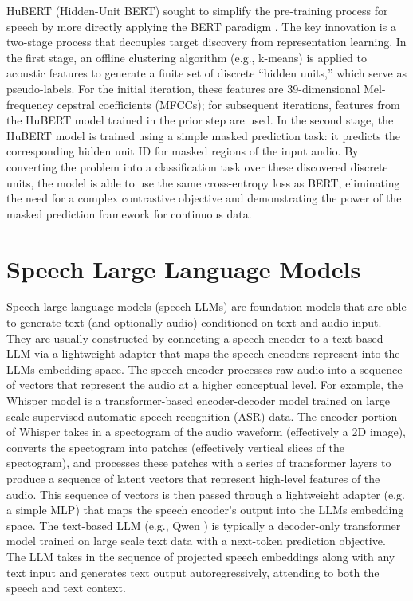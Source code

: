 \documentclass{report}
\begin{document}
HuBERT (Hidden-Unit BERT) sought to simplify the pre-training process for speech by more directly applying the BERT paradigm \citep{hsu2021hubertselfsupervisedspeechrepresentation}. The key innovation is a two-stage process that decouples target discovery from representation learning. In the first stage, an offline clustering algorithm (e.g., k-means) is applied to acoustic features to generate a finite set of discrete ``hidden units,'' which serve as pseudo-labels. For the initial iteration, these features are 39-dimensional Mel-frequency cepstral coefficients (MFCCs); for subsequent iterations, features from the HuBERT model trained in the prior step are used. In the second stage, the HuBERT model is trained using a simple masked prediction task: it predicts the corresponding hidden unit ID for masked regions of the input audio. By converting the problem into a classification task over these discovered discrete units, the model is able to use the same cross-entropy loss as BERT, eliminating the need for a complex contrastive objective and demonstrating the power of the masked prediction framework for continuous data.

\section{Speech Large Language Models}
\label{sec:speech_large_language_models}
Speech large language models (speech LLMs) are foundation models that are able to generate text (and optionally audio) conditioned on text and audio input. They are usually constructed by connecting a speech encoder to a text-based LLM via a lightweight adapter that maps the speech encoders represent into the LLMs embedding space. The speech encoder processes raw audio into a sequence of vectors that represent the audio at a higher conceptual level. For example, the Whisper model \citep{radford2022robustspeechrecognitionlargescale} is a transformer-based encoder-decoder model trained on large scale supervised automatic speech recognition (ASR) data. The encoder portion of Whisper takes in a spectogram of the audio waveform (effectively a 2D image), converts the spectogram into patches (effectively vertical slices of the spectogram), and processes these patches with a series of transformer layers to produce a sequence of latent vectors that represent high-level features of the audio. This sequence of vectors is then passed through a lightweight adapter (e.g. a simple MLP) that maps the speech encoder’s output into the LLMs embedding space. The text-based LLM (e.g., Qwen \citep{chu2023qwenaudioadvancinguniversalaudio}) is typically a decoder-only transformer model trained on large scale text data with a next-token prediction objective. The LLM takes in the sequence of projected speech embeddings along with any text input and generates text output autoregressively, attending to both the speech and text context.
\end{document}
